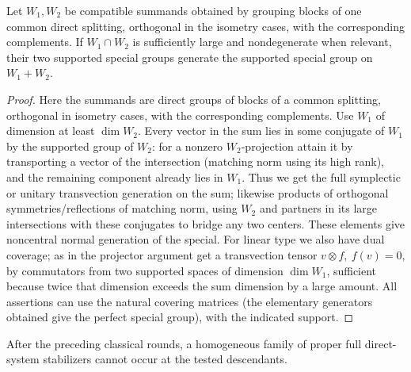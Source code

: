 \begin{lemma}\label{fa:direct-merging}
Let \(W_1,W_2\) be compatible summands obtained by grouping blocks of one common direct splitting,
orthogonal in the isometry cases, with the corresponding complements.  If \(W_1\cap W_2\) is sufficiently
large and nondegenerate when relevant, their two supported special groups generate the supported special
group on \(W_1+W_2\).
\end{lemma}

\begin{proof}

Here the summands are direct groups of blocks of a common splitting, orthogonal in isometry cases, with
the corresponding complements. Use \(W_1\) of dimension at least \(\dim W_2\). Every vector in the sum
lies in some conjugate of \(W_1\) by the supported group of \(W_2\): for a nonzero \(W_2\)-projection
attain it by transporting a vector of the intersection (matching norm using its high rank), and the
remaining component already lies in \(W_1\). Thus we get the full symplectic or unitary transvection
generation on the sum; likewise products of orthogonal symmetries/reflections of matching norm, using
\(W_2\) and partners in its large intersections with these conjugates to bridge any two centers. These
elements give noncentral normal generation of the special. For linear type we also have dual coverage; as
in the projector argument get a transvection tensor \(v\otimes f,\ f(v)=0\), by commutators from two
supported spaces of dimension \(\dim W_1\), sufficient because twice that dimension exceeds the sum
dimension by a large amount. All assertions can use the natural covering matrices (the elementary
generators obtained give the perfect special group), with the indicated support.

\end{proof}

\begin{proposition}\label{fa:direct-exclusion}
After the preceding classical rounds, a homogeneous family of proper full direct-system stabilizers
cannot occur at the tested descendants.
\end{proposition}


